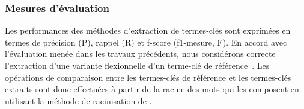       \subsubsection{Mesures d'évaluation}
      \label{subsubsec:main-automatic_keyphrase_annotation-unsupervised_automatic_keyphrase_extraction-evaluation-evaluation_measures}
        Les performances des méthodes d'extraction de termes-clés sont exprimées
        en termes de précision (P), rappel (R) et f-score (f1-mesure, F). En
        accord avec l'évaluation menée dans les travaux précédents, nous
        considérons correcte l'extraction d'une variante flexionnelle d'un
        terme-clé de référence~\cite{kim2010semeval}. Les opérations de
        comparaison entre les termes-clés de référence et les termes-clés
        extraits sont donc effectuées à partir de la racine des mots qui les
        composent en utilisant la méthode de racinisation de
        .

